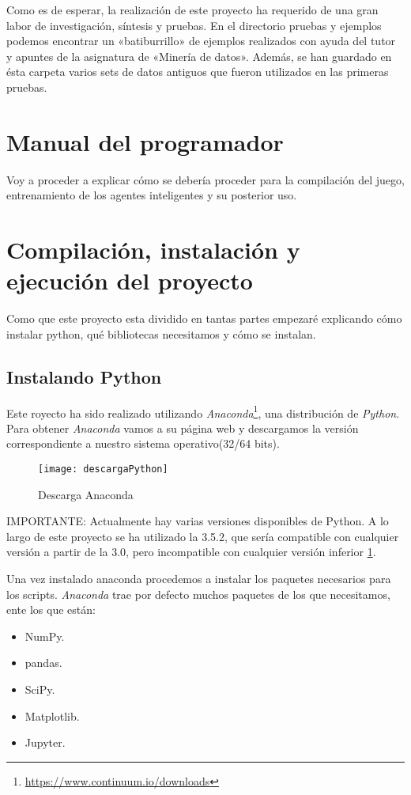 Como es de esperar, la realización de este proyecto ha requerido de una gran labor de investigación, síntesis y pruebas. En el directorio pruebas y ejemplos podemos encontrar un «batiburrillo» de ejemplos realizados con ayuda del tutor y apuntes de la asignatura de «Minería de datos». Además, se han guardado en ésta carpeta varios sets de datos antiguos que fueron utilizados en las primeras pruebas.


\section{Manual del programador}
Voy a proceder a explicar cómo se debería proceder para la compilación del juego, entrenamiento de los agentes inteligentes y su posterior uso.


\section{Compilación, instalación y ejecución del proyecto}
Como que este proyecto esta dividido en tantas partes empezaré explicando cómo instalar python, qué bibliotecas necesitamos y cómo se instalan.

\subsection{Instalando Python}

Este royecto ha sido realizado utilizando \emph{Anaconda}\footnote{\url{https://www.continuum.io/downloads}}, una distribución de \emph{Python}. Para obtener \emph{Anaconda} vamos a su página web y descargamos la versión correspondiente a nuestro sistema operativo(32/64 bits). 

\begin{figure}[h!]
    \centering
    \texttt{[image: descargaPython]}
    \caption{Descarga Anaconda}
    \label{fig:anaconda}
\end{figure}


IMPORTANTE: Actualmente hay varias versiones disponibles de Python. A lo largo de este proyecto se ha utilizado la 3.5.2, que sería compatible con cualquier versión a partir de la 3.0, pero incompatible con cualquier versión inferior \ref{fig:anaconda}.

Una vez instalado anaconda procedemos a instalar los paquetes necesarios para los scripts. \emph{Anaconda} trae por defecto muchos paquetes de los que necesitamos, ente los que están: 
\begin{itemize}
    \item NumPy.
    \item pandas.
    \item SciPy.
    \item Matplotlib.
    \item Jupyter.
\end{itemize}

